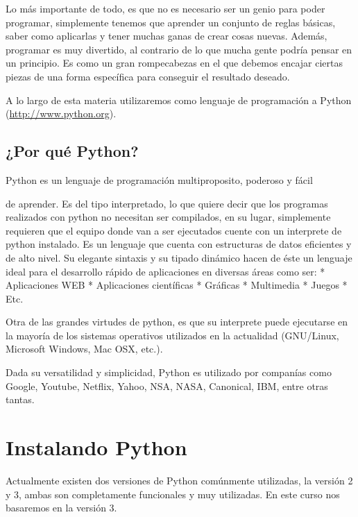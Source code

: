 \documentclass[a4paper,12pt,spanish]{sphinxmanual}
\begin{document}
Lo más importante de todo, es que no es necesario ser un genio para
poder programar, simplemente tenemos que aprender un conjunto de reglas
básicas, saber como aplicarlas y tener muchas ganas de crear cosas
nuevas. Además, programar es muy divertido, al contrario de lo que mucha
gente podría pensar en un principio. Es como un gran rompecabezas en el
que debemos encajar ciertas piezas de una forma específica para
conseguir el resultado deseado.

A lo largo de esta materia utilizaremos como lenguaje de programación a
Python (\href{http://www.python.org}{http://www.python.org}).


\subsection{¿Por qué Python?}
\label{Unidad01:por-que-python}
\begin{DUlineblock}{0em}
\item[] Python es un lenguaje de programación multiproposito, poderoso y fácil
\end{DUlineblock}

de aprender. Es del tipo interpretado, lo que quiere decir que los
programas realizados con python no necesitan ser compilados, en su
lugar, simplemente requieren que el equipo donde van a ser ejecutados
cuente con un interprete de python instalado. Es un lenguaje que cuenta
con estructuras de datos eficientes y de alto nivel. Su elegante
sintaxis y su tipado dinámico hacen de éste un lenguaje ideal para el
desarrollo rápido de aplicaciones en diversas áreas como ser: *
Aplicaciones WEB * Aplicaciones científicas * Gráficas * Multimedia
* Juegos
\textbar{} * Etc.

Otra de las grandes virtudes de python, es que su interprete puede
ejecutarse en la mayoría de los sistemas operativos utilizados en la
actualidad (GNU/Linux, Microsoft Windows, Mac OSX, etc.).

Dada su versatilidad y simplicidad, Python es utilizado por companías
como Google, Youtube, Netflix, Yahoo, NSA, NASA, Canonical, IBM, entre
otras tantas.


\section{Instalando Python}
\label{Unidad01:instalando-python}
Actualmente existen dos versiones de Python comúnmente utilizadas, la
versión 2 y 3, ambas son completamente funcionales y muy utilizadas. En
este curso nos basaremos en la versión 3.
\end{document}
